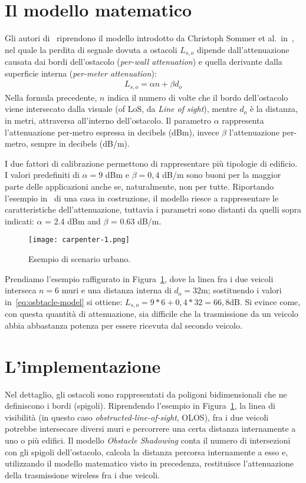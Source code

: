 \section{Il modello matematico}
Gli autori di~\cite{Carpenter:2015:OMI:2756509.2756512} riprendono il modello introdotto da Christoph Sommer et al.\ in~\cite{5720204},
nel quale la perdita di segnale dovuta a ostacoli $L_{s,o}$ dipende dall'attenuazione causata dai bordi dell'ostacolo (\textit{per-wall attenuation})
e quella derivante dalla superficie interna (\textit{per-meter attenuation}):
\begin{gather}\label{eq:osbtacle-model}
	L_{s,o} = \alpha n + \beta d_o
\end{gather}
Nella formula precedente, $n$ indica il numero di volte che il bordo dell'ostacolo viene intersecato dalla visuale (of LoS, da \textit{Line of sight}),
mentre $d_o$ è la distanza, in metri, attraversa all'interno dell'ostacolo.
Il parametro $\alpha$ rappresenta l'attenuazione per-metro espressa in decibels (dBm), invece
$\beta$ l'attenuazione per-metro, sempre in decibels (dB/m).

I due fattori di calibrazione permettono di rappresentare più tipologie di edificio.
I valori predefiniti di $\alpha = 9$ dBm e $\beta = 0,4$ dB/m sono buoni per la maggior parte delle applicazioni
anche se, naturalmente, non per tutte.
Riportando l'esempio in~\cite{5720204} di una casa in costruzione, il modello riesce a rappresentare le caratteristiche dell'attenuazione,
tuttavia i parametri sono distanti da quelli sopra indicati: $\alpha$ = 2.4 dBm and $\beta$ = 0.63 dB/m.
%
\begin{figure}[!h]
	\centering
	\begin{center}
		\texttt{[image: carpenter-1.png]}
	\end{center}
	\label{fig:scenario-urbano-1}\caption{Esempio di scenario urbano.}
\end{figure}
%
Prendiamo l'esempio raffigurato in Figura~\ref{fig:scenario-urbano-1}, dove la linea fra i due veicoli interseca $n=6$ muri e una distanza interna di $d_o=32$m;
sostituendo i valori in~\ref{eq:osbtacle-model} si ottiene: $L_{s,o} = 9*6 + 0,4*32 = 66,8$dB.
Si evince come, con questa quantità di attenuazione, sia difficile che la trasmissione da un veicolo abbia abbastanza potenza per essere ricevuta dal secondo veicolo.
%
\section{L'implementazione}
Nel dettaglio, gli ostacoli sono rappresentati da poligoni bidimensionali che ne definiscono i bordi (spigoli).
Riprendendo l'esempio in Figura~\ref{fig:scenario-urbano-1}, la linea di visibilità (in questo caso \textit{obstructed-line-of-sight}, OLOS), fra i due veicoli potrebbe
intersecare diversi muri e percorrere una certa distanza internamente a uno o più edifici.
Il modello \textit{Obstacle Shadowing} conta il numero di intersezioni con gli spigoli dell'ostacolo, calcola la distanza percorsa internamente a esso e, utilizzando
il modello matematico visto in precedenza, restituisce l'attenuazione della trasmissione wireless fra i due veicoli.

